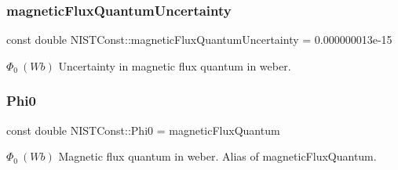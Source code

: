 \subsubsection{\texorpdfstring{magnetic\+Flux\+Quantum\+Uncertainty}{magneticFluxQuantumUncertainty}}
{\footnotesize\ttfamily const double N\+I\+S\+T\+Const\+::magnetic\+Flux\+Quantum\+Uncertainty = 0.\+000000013e-\/15}

$\Phi_0 \ (Wb)$ Uncertainty in magnetic flux quantum in weber. \mbox{\label{group___magnetic_flux_quantum_ga17c4e5dc1a9ccc86990f9236ffbc42a3}} 
\subsubsection{\texorpdfstring{Phi0}{Phi0}}
{\footnotesize\ttfamily const double N\+I\+S\+T\+Const\+::\+Phi0 = magnetic\+Flux\+Quantum}

$\Phi_0 \ (Wb)$ Magnetic flux quantum in weber. Alias of magnetic\+Flux\+Quantum. 